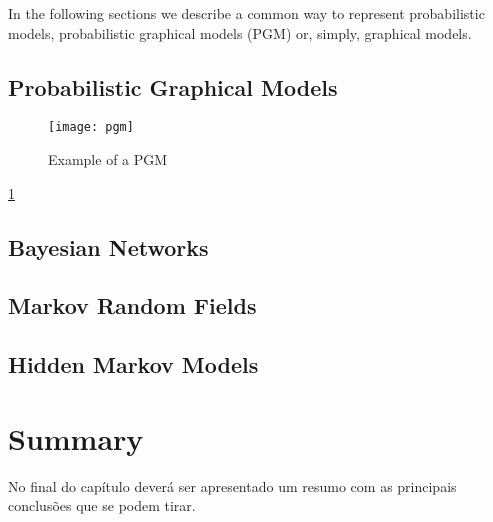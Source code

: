 In the following sections we describe a common way to represent probabilistic models, probabilistic graphical models (PGM) or, simply, graphical models.


\subsection{Probabilistic Graphical Models}



\begin{figure}[t]
	\begin{center}
		\leavevmodesharex
		\texttt{[image: pgm]}
		\caption{Example of a PGM}
		\label{fig:pgm}
	\end{center}
\end{figure}

\ref{fig:pgm}

\subsection{Bayesian Networks}

\subsection{Markov Random Fields}

\subsection{Hidden Markov Models}

\cite{Rabiner1989}

\section{Summary}

No final do capítulo deverá ser apresentado um resumo com as 
principais conclusões que se podem tirar. 
